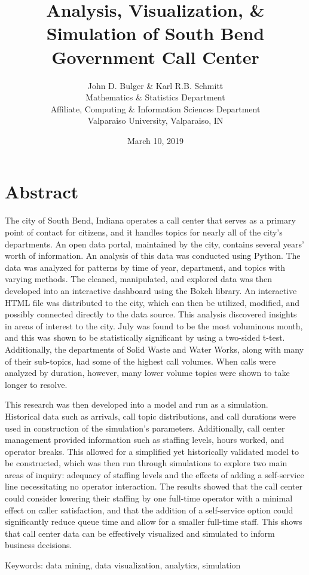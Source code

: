 \documentclass[12pt]{article}
\title{Analysis, Visualization, \& Simulation of South Bend Government Call Center}
\author{John D. Bulger \& Karl R.B. Schmitt\\
	Mathematics \& Statistics Department\\
	Affiliate, Computing \& Information Sciences Department
	\\Valparaiso University, Valparaiso, IN}
\date{March 10, 2019}
\begin{document}
	
\section*{Abstract}

The city of South Bend, Indiana operates a call center that serves as a primary point of contact for citizens, and it handles topics for nearly all of the city's departments.  An open data portal, maintained by the city, contains several years’ worth of information.  An analysis of this data was conducted using Python.  The data was analyzed for patterns by time of year, department, and topics with varying methods.  The cleaned, manipulated, and explored data was then developed into an interactive dashboard using the Bokeh library.  An interactive HTML file was distributed to the city, which can then be utilized, modified, and possibly connected directly to the data source.  This analysis discovered insights in areas of interest to the city.  July was found to be the most voluminous month, and this was shown to be statistically significant by using a two-sided t-test.  Additionally, the departments of Solid Waste and Water Works, along with many of their sub-topics, had some of the highest call volumes.  When calls were analyzed by duration, however, many lower volume topics were shown to take longer to resolve.

\par

This research was then developed into a model and run as a simulation.  Historical data such as arrivals, call topic distributions, and call durations were used in construction of the simulation's parameters.  Additionally, call center management provided information such as staffing levels, hours worked, and operator breaks.  This allowed for a simplified yet historically validated model to be constructed, which was then run through simulations to explore two main areas of inquiry:  adequacy of staffing levels and the effects of adding a self-service line necessitating no operator interaction.  The results showed that the call center could consider lowering their staffing by one full-time operator with a minimal effect on caller satisfaction, and that the addition of a self-service option could significantly reduce queue time and allow for a smaller full-time staff.  This shows that call center data can be effectively visualized and simulated to inform business decisions.

\par

Keywords:  data mining, data visualization, analytics, simulation

 
\end{document}
